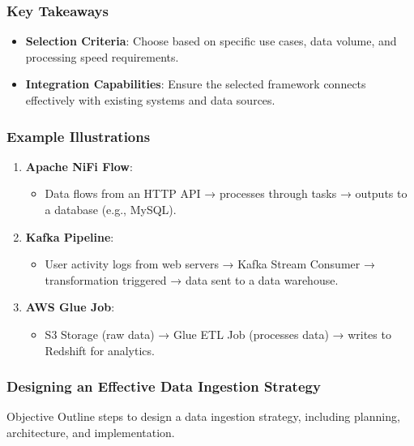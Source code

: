 \documentclass{beamer}
\begin{document}
\begin{frame}[fragile]
    \frametitle{Key Takeaways}
    \begin{itemize}
        \item \textbf{Selection Criteria}: Choose based on specific use cases, data volume, and processing speed requirements.
        \item \textbf{Integration Capabilities}: Ensure the selected framework connects effectively with existing systems and data sources.
    \end{itemize}
\end{frame}

\begin{frame}[fragile]
    \frametitle{Example Illustrations}
    \begin{enumerate}
        \item \textbf{Apache NiFi Flow}:
        \begin{itemize}
            \item Data flows from an HTTP API → processes through tasks → outputs to a database (e.g., MySQL).
        \end{itemize}
        \item \textbf{Kafka Pipeline}:
        \begin{itemize}
            \item User activity logs from web servers → Kafka Stream Consumer → transformation triggered → data sent to a data warehouse.
        \end{itemize}
        \item \textbf{AWS Glue Job}:
        \begin{itemize}
            \item S3 Storage (raw data) → Glue ETL Job (processes data) → writes to Redshift for analytics.
        \end{itemize}
    \end{enumerate}
\end{frame}

\begin{frame}[fragile]
    \frametitle{Designing an Effective Data Ingestion Strategy}
    \begin{block}{Objective}
        Outline steps to design a data ingestion strategy, including planning, architecture, and implementation.
    \end{block}
\end{frame}
\end{document}
